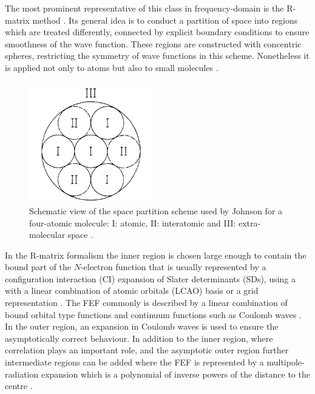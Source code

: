 {The most prominent representative of this class in frequency-domain is the R-matrix method \cite{r-mat, r-mat2,Burke}.
Its general idea is to conduct a partition of space into regions which are treated differently, connected by explicit boundary conditions to ensure smoothness of the wave function.
These regions are constructed with concentric spheres, restricting the symmetry of wave functions in this scheme.
Nonetheless it is applied not only to atoms \cite{Li-R,Li-R1,Li-R2} but also to small molecules \cite{R-mol1,R-mol2}.
\begin{figure}
   \includegraphics[width=0.48\textwidth]{Figures/JohnsonSpheres}
   \caption{Schematic view of the space partition scheme used by Johnson for a four-atomic molecule:
    I: atomic, II: interatomic and III: extra-molecular space \cite{johnson}.}
   \label{fig:johnson}
\end{figure}
In the R-matrix formalism the inner region is chosen large enough to contain the bound part of the $N$-electron function that is usually represented by a configuration interaction (CI) expansion of Slater determinants (SDs), using a with a linear combination of atomic orbitals (LCAO) basis or a grid representation \cite{Burke}.
The FEF commonly is described by a linear combination of bound orbital type functions and continuum functions such as Coulomb waves \cite{r-mat, r-mat2}. %
In the outer region, an expansion in Coulomb waves is used to ensure the asymptotically correct behaviour.
In addition to the inner region, where correlation plays an important role, and the asymptotic outer region further intermediate regions can be added  where the FEF is represented by a multipole-radiation expansion which is a polynomial of inverse powers of the distance to the centre \cite{Burke}.

}

